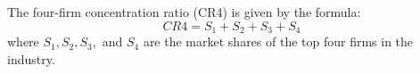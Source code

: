 \documentclass{article}
\begin{document}
The four-firm concentration ratio (CR4) is given by the formula:
\[
CR4 = S_1 + S_2 + S_3 + S_4
\]
where \( S_1, S_2, S_3, \) and \( S_4 \) are the market shares of the top four firms in the industry.
\\
\end{document}
